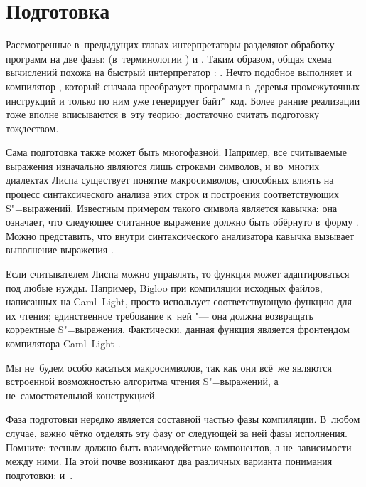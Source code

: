 \section{Подготовка}\label{macros/sect:preparation}

Рассмотренные в~предыдущих главах интерпретаторы разделяют обработку программ
на две фазы:  (в~терминологии {\ISLisp}) и .
Таким образом, общая схема вычислений похожа на быстрый интерпретатор
: . Нечто подобное
выполняет и компилятор , который сначала
преобразует программы в~деревья промежуточных инструкций и только по ним уже
генерирует байт"~код. Более ранние реализации тоже вполне вписываются в~эту
теорию: достаточно считать подготовку тождеством.

Сама подготовка также может быть многофазной. Например, все считываемые
выражения изначально являются лишь строками символов, и во~многих диалектах
Лиспа существует понятие макросимволов, способных влиять на процесс
синтаксического анализа этих строк и построения соответствующих S"=выражений.
Известным примером такого символа является кавычка: она означает, что следующее
считанное выражение должно быть обёрнуто в~форму . Можно представить,
что внутри синтаксического анализатора кавычка вызывает выполнение выражения
.

Если считывателем Лиспа можно управлять, то функция  может
адаптироваться под любые нужды. Например, Bigloo \cite{sw94} при компиляции
исходных файлов, написанных на Caml~Light, просто использует соответствующую
функцию для их чтения; единственное требование к~ней "--- она должна возвращать
корректные S"=выражения. Фактически, данная функция  является
фронтендом компилятора Caml~Light \cite{lw93}.

Мы не~будем особо касаться макросимволов, так как они всё~же являются встроенной
возможностью алгоритма чтения S"=выражений, а не~самостоятельной конструкцией.

Фаза подготовки нередко является составной частью фазы компиляции. В~любом
случае, важно чётко отделять эту фазу от следующей за ней фазы исполнения.
Помните: тесным должно быть взаимодействие компонентов, а не~зависимости между
ними. На этой почве возникают два различных варианта понимания подготовки:
 и~.


